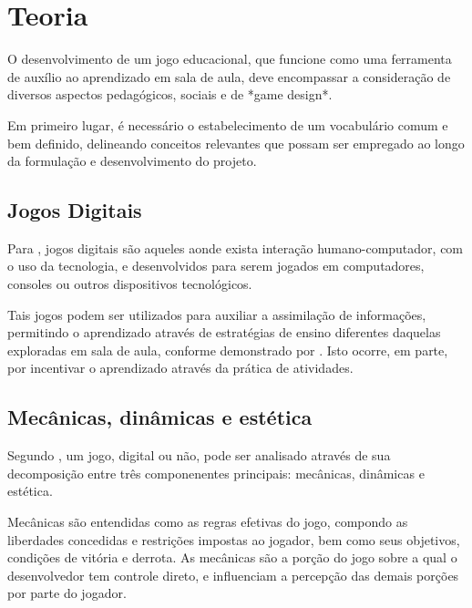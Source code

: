 
\chapter{Teoria}\label{cap-teoria}

O desenvolvimento de um jogo educacional, que funcione como uma ferramenta de auxílio ao aprendizado em sala de aula, deve encompassar a consideração de diversos aspectos pedagógicos, sociais e de *game design*.

Em primeiro lugar, é necessário o estabelecimento de um vocabulário comum e bem definido, delineando conceitos relevantes que possam ser empregado ao longo da formulação e desenvolvimento do projeto.

\section{Jogos Digitais}\label{sec-jogosdigitais}

Para \cite{correia:2009:digital_games_spore}, jogos digitais são aqueles aonde exista interação humano-computador, com o uso da tecnologia, e desenvolvidos para serem jogados em computadores, consoles ou outros dispositivos tecnológicos.

Tais jogos podem ser utilizados para auxiliar a assimilação de informações, permitindo o aprendizado através de estratégias de ensino diferentes daquelas exploradas em sala de aula, conforme demonstrado por \cite{fernandes:2012:digital_education}. Isto ocorre, em parte, por incentivar o aprendizado através da prática de atividades.

\section{Mecânicas, dinâmicas e estética}\label{sec-mecanica-dinamica-estetica}

Segundo \cite{hunicke:2004}, um jogo, digital ou não, pode ser analisado através de sua decomposição entre três componenentes principais: mecânicas, dinâmicas e estética.

Mecânicas são entendidas como as regras efetivas do jogo, compondo as liberdades concedidas e restrições impostas ao jogador, bem como seus objetivos, condições de vitória e derrota. As mecânicas são a porção do jogo sobre a qual o desenvolvedor tem controle direto, e influenciam a percepção das demais porções por parte do jogador.

